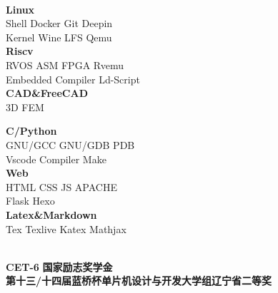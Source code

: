 \documentclass{ctexart}
\begin{document}
\begin{center}
    \hrulefill \\
    \begin{minipage}[t]{18em}
        \centering
        \textbf{Linux} \\
        Shell \quad Docker \quad Git \quad Deepin \\
        Kernel \quad Wine \quad LFS \quad Qemu \\
        
        \textbf{Riscv} \\
        RVOS \quad ASM \quad FPGA \quad Rvemu \\
        Embedded \quad Compiler \quad Ld-Script \\
        \textbf{CAD\&FreeCAD} \\
        3D \quad FEM \\
    \end{minipage}
    \quad 
    \begin{minipage}[t]{18em}
        \centering
        \textbf{C/Python} \\
        GNU/GCC \quad GNU/GDB \quad PDB \\
        Vscode \quad Compiler \quad Make \\
        \textbf{Web} \\
        HTML \quad CSS \quad JS \quad APACHE \\
        Flask \quad Hexo \\
        \textbf{Latex\&Markdown}\\
        Tex \quad Texlive \quad Katex \quad Mathjax \\
    \end{minipage}
    \quad
\end{center}

\begin{flushleft}
    \hrulefill \\
    \textbullet \textbf{CET-6 } \qquad 
    \textbullet \textbf{国家励志奖学金}\\
    \textbullet \textbf{第十三/十四届蓝桥杯单片机设计与开发大学组辽宁省二等奖}
\end{flushleft}
\end{document}

